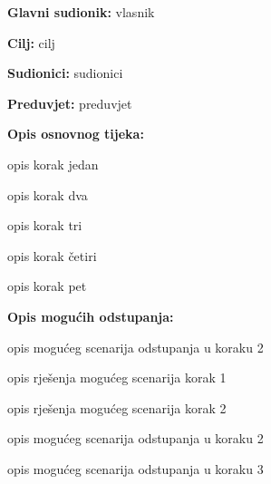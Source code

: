 					\noindent {}
					\begin{packed_item}
						
						\item \textbf{Glavni sudionik: }vlasnik
						\item  \textbf{Cilj:} cilj
						\item  \textbf{Sudionici:} sudionici
						\item  \textbf{Preduvjet:} preduvjet
						\item  \textbf{Opis osnovnog tijeka:}
						
						\item[] \begin{packed_enum}
							
							\item opis korak jedan
							\item opis korak dva
							\item opis korak tri
							\item opis korak četiri
							\item opis korak pet
						\end{packed_enum}
						
						\item  \textbf{Opis mogućih odstupanja:}
						
						\item[] \begin{packed_item}
							
							\item[2.a] opis mogućeg scenarija odstupanja u koraku 2
							\item[] \begin{packed_enum}
								
								\item opis rješenja mogućeg scenarija korak 1
								\item opis rješenja mogućeg scenarija korak 2
								
							\end{packed_enum}
							\item[2.b] opis mogućeg scenarija odstupanja u koraku 2
							\item[3.a] opis mogućeg scenarija odstupanja  u koraku 3
							
						\end{packed_item}
					\end{packed_item}
					
